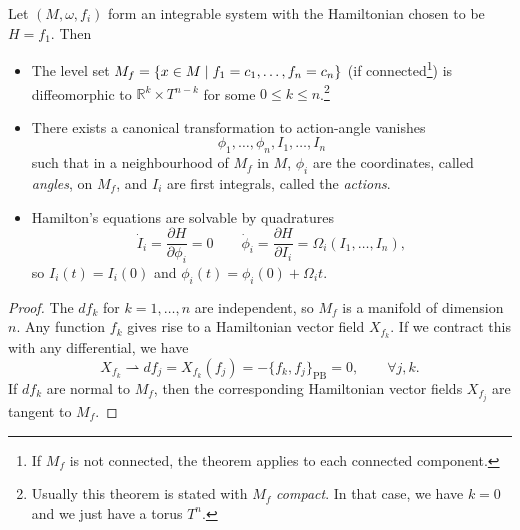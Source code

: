\begin{theorem}
  Let $(M, \omega, f_i)$ form an integrable system with the Hamiltonian chosen to be $H = f_1$.
  Then
  \begin{itemize}
    \item The level set $M_f = \{x \in M \suchthat f_1 = c_1, \dots, f_n = c_n\}$ (if connected\footnote{If $M_f$ is not connected, the theorem applies to each connected component.}) is diffeomorphic to $\mathbb{R}^k \times T^{n-k}$ for some $0 \leq k \leq n$.\footnote{Usually this theorem is stated with $M_f$ \emph{compact}. In that case, we have $k = 0$ and we just have a torus $T^n$.}
    \item There exists a canonical transformation to action-angle vanishes
      \begin{equation}
        \phi_1, \dots, \phi_n, I_1, \dots, I_n
      \end{equation}
      such that in a neighbourhood of $M_f$ in $M$, $\phi_i$ are the coordinates, called \emph{angles}, on $M_f$, and $I_i$ are first integrals, called the \emph{actions}.
    \item Hamilton's equations are solvable by quadratures 
      \begin{equation}
	\dot{I}_i = \frac{\partial H}{\partial \phi_i} = 0 \qquad \dot{\phi}_i = \frac{\partial H}{\partial I_i} = \Omega_i (I_1, \dots, I_n),
      \end{equation}
      so $I_i(t) = I_i(0)$ and $\phi_i(t) = \phi_i(0) + \Omega_i t$.
  \end{itemize}
\end{theorem}
\begin{proof}
  The $d f_k$ for $k = 1, \dots, n$ are independent, so $M_f$ is a manifold of dimension $n$.
  Any function $f_k$ gives rise to a Hamiltonian vector field $X_{f_k}$. 
  If we contract this with any differential, we have
  \begin{equation}
    X_{f_k} \rightharpoonup d f_j = X_{f_k} (f_j) = - \{ f_k, f_j \}_{\text{PB}} = 0, \qquad \forall j,k.
  \end{equation}
  If $d f_k$ are normal to $M_f$, then the corresponding Hamiltonian vector fields $X_{f_j}$ are tangent to $M_f$.
\end{proof}
